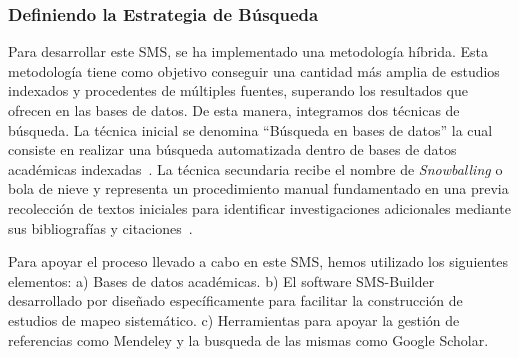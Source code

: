\subsubsection{Definiendo la Estrategia de Búsqueda}\label{subsubsec:estrategia-busqueda}

Para desarrollar este SMS, se ha implementado una metodología híbrida. Esta metodología tiene como objetivo conseguir una cantidad más amplia de estudios indexados y procedentes de múltiples fuentes, superando los resultados que ofrecen en las bases de datos. De esta manera, integramos dos técnicas de búsqueda. La técnica inicial se denomina ``Búsqueda en bases de datos'' la cual consiste en realizar una búsqueda automatizada dentro de bases de datos académicas indexadas~\cite{Jalai-01}. La técnica secundaria recibe el nombre de \textit{Snowballing} o bola de nieve y representa un procedimiento manual fundamentado en una previa recolección de textos iniciales para identificar investigaciones adicionales mediante sus bibliografías y citaciones~\cite{Jalai-01,Goodman-01}.

Para apoyar el proceso llevado a cabo en este SMS, hemos utilizado los siguientes elementos: a) Bases de datos académicas. b) El software SMS-Builder desarrollado por \cite{Candela2022100935} diseñado específicamente para facilitar la construcción de estudios de mapeo sistemático. c) Herramientas para apoyar la gestión de referencias como Mendeley y la busqueda de las mismas como Google Scholar.